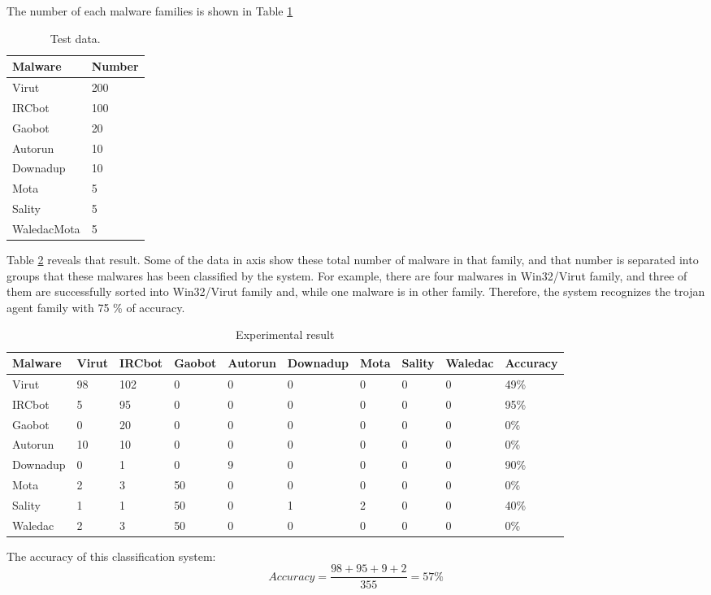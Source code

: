  The number of each malware families is shown in Table \ref{table:testdata}
 \begin{table}
  \begin{center}
    \begin{tabular}{ | l | l |}
     \hline
    Malware & Number\\ \hline
    Virut & 200\\ \hline
	IRCbot & 100\\ \hline
	Gaobot  & 20\\ \hline
	Autorun & 10\\ \hline
	Downadup &  10\\ \hline
	Mota & 5\\ \hline
	Sality  & 5  \\ \hline
	WaledacMota & 5\\ \hline
    \end{tabular}
	\end{center}
     \caption{Test data.}
      \label{table:testdata}
\end{table}
Table \ref{table:experimentalresult} reveals that result. Some of the data in axis show these total number of malware in that family, and that number is separated into groups that these malwares has been classified by the system. For example, there are four malwares in Win32/Virut family, and three of them are successfully sorted into Win32/Virut family and, while one malware is in other family. Therefore, the system recognizes the trojan agent family with 75 \% of accuracy.
\begin{table}
  \begin{center}
    \begin{tabular}{ | l | l | l | l | l | l | l | l | l | l |}
     \hline
    Malware & Virut & IRCbot& Gaobot &  Autorun & Downadup  & Mota & Sality & Waledac & Accuracy\\ \hline
    Virut & 98 & 102 & 0 & 0 & 0 & 0  & 0  & 0 & 49\%\\ \hline
    IRCbot & 5 & 95 & 0 & 0 & 0 & 0  & 0  & 0 & 95\%\\ \hline    
	Gaobot & 0 & 20 & 0 & 0 & 0 & 0  & 0  & 0 & 0\%\\ \hline
	Autorun & 10 & 10 & 0 & 0 & 0 & 0  & 0  & 0 & 0\%\\ \hline	
	Downadup & 0 & 1 & 0 & 9 & 0 & 0  & 0  & 0 & 90\%\\ \hline
	Mota  & 2 & 3 & 50 & 0 & 0 & 0  & 0  & 0 & 0\%\\ \hline
	Sality  & 1 & 1 & 50 & 0 & 1 & 2  & 0  & 0 & 40\%\\ \hline	
	Waledac & 2 & 3 & 50 & 0 & 0 & 0  & 0  & 0 & 0\% \\ \hline
    \end{tabular}
	\end{center}
     \caption{Experimental result}
    \label{table:experimentalresult}
\end{table}
The accuracy of this classification system:
\begin{equation}
Accuracy=\frac{98+95+9+2}{355}=57\%
\end{equation}

